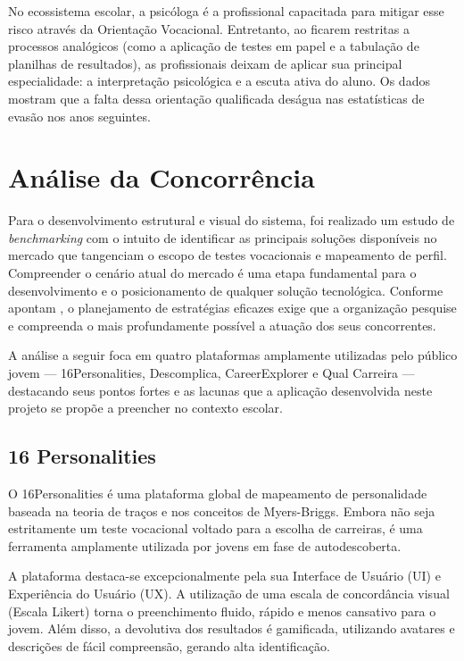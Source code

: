 No ecossistema escolar, a psicóloga é a profissional capacitada para mitigar esse risco através da Orientação Vocacional. Entretanto, ao ficarem restritas a processos analógicos (como a aplicação de testes em papel e a tabulação de planilhas de resultados), as profissionais deixam de aplicar sua principal especialidade: a interpretação psicológica e a escuta ativa do aluno. Os dados mostram que a falta dessa orientação qualificada deságua nas estatísticas de evasão nos anos seguintes.

\section{Análise da Concorrência}

Para o desenvolvimento estrutural e visual do sistema, foi realizado um estudo de \textit{benchmarking} com o intuito de identificar as principais soluções disponíveis no mercado que tangenciam o escopo de testes vocacionais e mapeamento de perfil. Compreender o cenário atual do mercado é uma etapa fundamental para o desenvolvimento e o posicionamento de qualquer solução tecnológica. Conforme apontam , o planejamento de estratégias eficazes exige que a organização pesquise e compreenda o mais profundamente possível a atuação dos seus concorrentes.

A análise a seguir foca em quatro plataformas amplamente utilizadas pelo público jovem --- 16Personalities, Descomplica, CareerExplorer e Qual Carreira --- destacando seus pontos fortes e as lacunas que a aplicação desenvolvida neste projeto se propõe a preencher no contexto escolar.

\subsection{16 Personalities}

O 16Personalities é uma plataforma global de mapeamento de personalidade baseada na teoria de traços e nos conceitos de Myers-Briggs. Embora não seja estritamente um teste vocacional voltado para a escolha de carreiras, é uma ferramenta amplamente utilizada por jovens em fase de autodescoberta.

A plataforma destaca-se excepcionalmente pela sua Interface de Usuário (UI) e Experiência do Usuário (UX). A utilização de uma escala de concordância visual (Escala Likert) torna o preenchimento fluido, rápido e menos cansativo para o jovem. Além disso, a devolutiva dos resultados é gamificada, utilizando avatares e descrições de fácil compreensão, gerando alta identificação.

